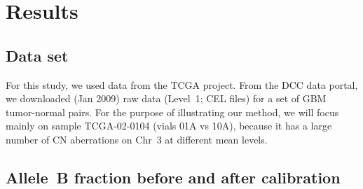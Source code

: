 \documentclass[draft]{bioinfo}
\begin{document}
 
\section{Results}
\label{secResults}

\subsection{Data set}
For this study, we used data from the TCGA project.  From the DCC data portal, we downloaded (Jan 2009) raw data (Level~1; CEL files) for a set of GBM tumor-normal pairs.
For the purpose of illustrating our method, we will focus mainly on sample TCGA-02-0104 (vials 01A vs 10A), because it has a large number of CN aberrations on Chr~3 at different mean levels.

\subsection{Allele~B fraction before and after calibration}
\begin{figure}[!tpbh]
\begin{center}
\end{center}
 \caption{
 }
 \label{figROCs,chr05}
\end{figure}
\end{document}
